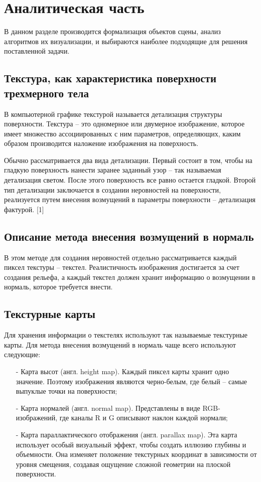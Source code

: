 \chapter{Аналитическая часть}
В данном разделе производится формализация объектов сцены, анализ алгоритмов их визуализации, и выбираются наиболее подходящие для решения поставленной задачи.

\section{Текстура, как характеристика поверхности трехмерного тела}

В компьютерной графике текстурой называется детализация структуры поверхности. Текстура – это одномерное или двумерное изображение, которое имеет множество ассоциированных с ним параметров, определяющих, каким образом производится наложение изображения на поверхность.

Обычно рассматривается два вида детализации. Первый состоит в том, чтобы на гладкую поверхность нанести заранее заданный узор – так называемая детализация светом. После этого поверхность все равно остается гладкой. Второй тип детализации заключается в создании неровностей на поверхности, реализуется путем внесения возмущений в параметры поверхности – детализация фактурой. [1]

\section{Описание метода внесения возмущений в нормаль}

В этом методе для создания неровностей отдельно рассматривается каждый пиксел текстуры – текстел. Реалистичность изображения достигается за счет создания рельефа, а каждый текстел должен хранит информацию о возмущении в нормаль, которое требуется внести.

\section{Текстурные карты}

Для хранения информации о текстелях используют так называемые текстурные карты. Для метода внесения возмущений в нормаль чаще всего используют следующие:
\begin{itemize}[label=\arabic*)]
	\item[-] Карта высот (англ. height map). Каждый пиксел карты хранит одно значение. Поэтому изображения являются черно-белым, где белый – самые выпуклые точки на поверхности;
	\item[-] Карта нормалей (англ. normal map). Представлены в виде RGB-изображений, где каналы R и G описывают наклон каждой нормали;
	\item[-] Карта параллактического отображения (англ. parallax map). Эта карта использует особый визуальный эффект, чтобы создать иллюзию глубины и объемности. Она изменяет положение текстурных координат в зависимости от уровня смещения, создавая ощущение сложной геометрии на плоской поверхности.
\end{itemize}

